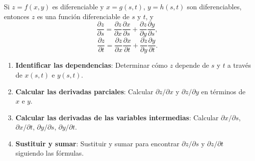 \begin{theorem}
Si $z = f(x, y)$ es diferenciable y $x = g(s, t)$, $y = h(s, t)$ son diferenciables, entonces $z$ es una función diferenciable de $s$ y $t$, y
\[
\frac{\partial z}{\partial s} = \frac{\partial z}{\partial x}\frac{\partial x}{\partial s} + \frac{\partial z}{\partial y}\frac{\partial y}{\partial s},
\]
\[
\frac{\partial z}{\partial t} = \frac{\partial z}{\partial x}\frac{\partial x}{\partial t} + \frac{\partial z}{\partial y}\frac{\partial y}{\partial t}.
\]
\end{theorem}

\begin{pasos}
\begin{enumerate}
    \item \textbf{Identificar las dependencias}: Determinar cómo $z$ depende de $s$ y $t$ a través de $x(s,t)$ e $y(s,t)$.
    \item \textbf{Calcular las derivadas parciales}: Calcular $\partial z/\partial x$ y $\partial z/\partial y$ en términos de $x$ e $y$.
    \item \textbf{Calcular las derivadas de las variables intermedias}: Calcular $\partial x/\partial s$, $\partial x/\partial t$, $\partial y/\partial s$, $\partial y/\partial t$.
    \item \textbf{Sustituir y sumar}: Sustituir y sumar para encontrar $\partial z/\partial s$ y $\partial z/\partial t$ siguiendo las fórmulas.
\end{enumerate}
\end{pasos}

